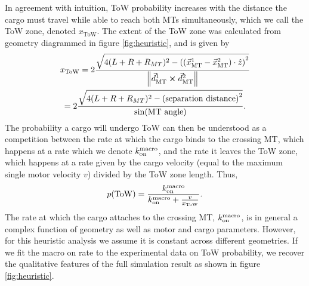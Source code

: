 In agreement with intuition, ToW probability increases with the distance the cargo must travel while able to reach both MTs simultaneously, which we call the ToW zone, denoted $x_\text{ToW}$. The extent of the ToW zone was calculated from geometry diagrammed in figure \ref{fig:heuristic}, and is given by
\begin{multline} \label{eq:ToW_zone}
x_\text{ToW}=2\frac{ \sqrt{4 (L+R+R_{MT})^2-\left( (\vec{x}_\text{MT}^1-\vec{x}_\text{MT}^2)\cdot \hat{z} \right)^2} }{\norm{\vec{d}_\text{MT}^1 \cross \vec{d}_\text{MT}^2}} \\
= 2\frac{ \sqrt{4 (L+R+R_{MT})^2-\left( \text{separation distance} \right)^2} }{\sin(\text{MT angle})}.
\end{multline}
The probability a cargo will undergo ToW can then be understood as a competition between the rate at which the cargo binds to the crossing MT, which happens at a rate which we denote $k_\text{on}^\text{macro}$, and the rate it leaves the ToW zone, which happens at a rate given by the cargo velocity (equal to the maximum single motor velocity $v$) divided by the ToW zone length. Thus,
\begin{equation} \label{eq:rate_war}
p(\text{ToW})=\frac{ k_\text{on}^\text{macro}}{k_\text{on}^\text{macro} +  \frac{v}{x_\text{ToW}}}.
\end{equation}
The rate at which the cargo attaches to the crossing MT, $k_\text{on}^\text{macro}$, is in general a complex function of geometry as well as motor and cargo parameters. However, for this heuristic analysis we assume it is constant across different geometries. If we fit the macro on rate to the experimental data on ToW probability, we recover the qualitative features of the full simulation result as shown in figure \ref{fig:heuristic}.

